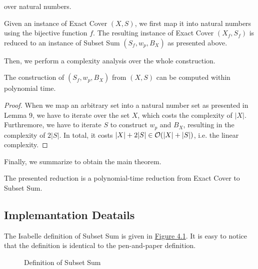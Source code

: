 over natural numbers. 
\begin{definition}
    Given an instance of Exact Cover $(X, S)$, 
    we first map it into natural numbers using the bijective function $f$. 
    The resulting instance of Exact Cover $(X_f, S_f)$ is reduced to an instance of Subset Sum $(S_f, w_p, B_X)$ as presented above.
\end{definition}
Then, we perform a complexity analysis over the whole construction.
\begin{lemma}
    The construction of $(S_f, w_p, B_X)$ from $(X, S)$ can be computed within polynomial time. 
\end{lemma}
\begin{proof}
    When we map an arbitrary set into a natural number set as presented in Lemma 9, we have to iterate over the set $X$, which costs the complexity of $|X|$. 
Furthremore, we have to iterate $S$ to construct $w_p$ and $B_X$, resulting in the complexity of $2|S|$. In total, it costs $|X| + 2|S| \in\mathcal{O}({|X| + |S|})$, 
i.e. the linear complexity. 
\end{proof}
Finally, we summarize to obtain the main theorem.
\begin{theorem}
    The presented reduction is a polynomial-time reduction from Exact Cover to Subset Sum.
\end{theorem}

\subsection{Implemantation Deatails}
The Isabelle definition of Subset Sum is given in \hyperref[fig:4.1]{Figure 4.1}. 
It is easy to notice that the definition is identical to the pen-and-paper definition.
\begin{figure}[!h]
    \caption{Definition of Subset Sum}
    \label{fig:4.1}
\end{figure}
